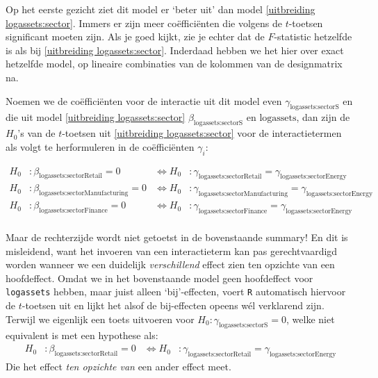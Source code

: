 \documentclass[a4paper]{report}
\begin{document}
  Op het eerste gezicht ziet dit model er `beter uit' dan model \ref{uitbreiding logassets:sector}. Immers er zijn meer co\"effici\"enten die volgens de $t$-toetsen significant moeten zijn. Als je goed kijkt, zie je echter dat de $F$-statistic hetzelfde is als bij \ref{uitbreiding logassets:sector}. Inderdaad hebben we het hier over exact hetzelfde model, op lineaire combinaties van de kolommen van de designmatrix na.
  
  Noemen we de co\"effici\"enten voor de interactie uit dit model even $\gamma_{\text{logassets:sectorS}}$ en die uit model \ref{uitbreiding logassets:sector} $\beta_{\text{logassets:sectorS}}$ en ${\text{logassets}}$, dan zijn de $H_0$'s van de $t$-toetsen uit \ref{uitbreiding logassets:sector} voor de interactietermen als volgt te herformuleren in de co\"effici\"enten $\gamma_i$:
  
  \begin{align*}
  H_0&:\beta_{\text{logassets:sectorRetail}} = 0 &\iff H_0&: \gamma_{\text{logassets:sectorRetail}}  = \gamma_{\text{logassets:sectorEnergy}} \\
  H_0&:\beta_{\text{logassets:sectorManufacturing}} = 0 &\iff H_0&: \gamma_{\text{logassets:sectorManufacturing}}  = \gamma_{\text{logassets:sectorEnergy}} \\
  H_0&:\beta_{\text{logassets:sectorFinance}} = 0 &\iff H_0&: \gamma_{\text{logassets:sectorFinance}}  = \gamma_{\text{logassets:sectorEnergy}} \\
  \end{align*}
  
  Maar de rechterzijde wordt niet getoetst in de bovenstaande summary! En dit is misleidend, want het invoeren van een interactieterm kan pas gerechtvaardigd worden wanneer we een duidelijk \emph{verschillend} effect zien ten opzichte van een hoofdeffect. Omdat we in het bovenstaande model geen hoofdeffect voor \verb!logassets! hebben, maar juist alleen `bij'-effecten, voert \verb!R! automatisch hiervoor de $t$-toetsen uit en lijkt het alsof de bij-effecten opeens w\' el verklarend zijn. Terwijl we eigenlijk een toets uitvoeren voor $H_0: \gamma_{\text{logassets:sectorS}} =0$, welke niet equivalent is met een hypothese als:
  \begin{align*}
  \label{toets1}
  H_0&:\beta_{\text{logassets:sectorRetail}} = 0 &\iff H_0&: \gamma_{\text{logassets:sectorRetail}}  = \gamma_{\text{logassets:sectorEnergy}}
  \end{align*}
  Die het effect \emph{ten opzichte van} een ander effect meet.
  
\end{document}
